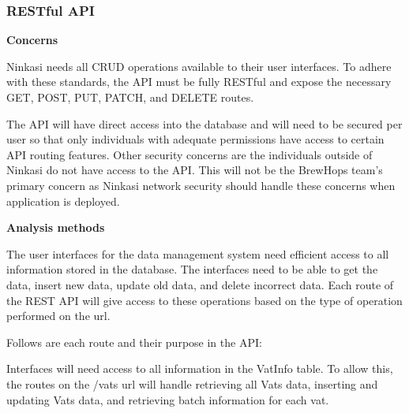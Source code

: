 \documentclass[draftclsnofoot,onecolumn,letterpaper,10pt]{IEEEtran}
\begin{document}
		\subsubsection{RESTful API}
			\textbf{Concerns}

			Ninkasi needs all CRUD operations available to their user interfaces.
			To adhere with these standards, the API must be fully RESTful and expose the necessary GET, POST, PUT, PATCH, and DELETE routes.

			The API will have direct access into the database and will need to be secured per user so that only individuals with adequate permissions have access to certain API routing features.
			Other security concerns are the individuals outside of Ninkasi do not have access to the API.
			This will not be the BrewHops team’s primary concern as Ninkasi network security should handle these concerns when application is deployed.

			\textbf{Analysis methods}

			The user interfaces for the data management system need efficient access to all information stored in the database.
			The interfaces need to be able to get the data, insert new data, update old data, and delete incorrect data.
			Each route of the REST API will give access to these operations based on the type of operation performed on the url.

			Follows are each route and their purpose in the API:

			Interfaces will need access to all information in the VatInfo table.
			To allow this, the routes on the /vats url will handle retrieving all Vats data, inserting and updating Vats data, and retrieving batch information for each vat.
\end{document}
